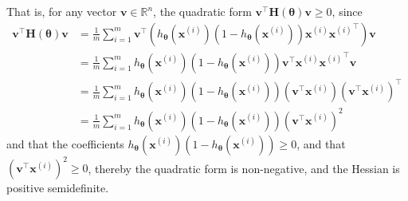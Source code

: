 That is, for any vector \( \mathbf{v} \in \mathbb{R}^n \), the quadratic form \( \mathbf{v}^\top \mathbf{H}(\boldsymbol{\theta}) \mathbf{v} \geq 0 \), since
\begin{align*}
    \mathbf{v}^\top \mathbf{H}(\boldsymbol{\theta}) \mathbf{v}
     & =
    \frac{1}{m} \sum_{i=1}^{m}
    \mathbf{v}^\top
    \left(
    h_{\boldsymbol{\theta}}\left(\mathbf{x}^{(i)}\right) \left(1-h_{\boldsymbol{\theta}}\left(\mathbf{x}^{(i)}\right)\right)
    \mathbf{x}^{(i)} {\mathbf{x}^{(i)}}^\top
    \right)
    \mathbf{v}
    \\ & =
    \frac{1}{m} \sum_{i=1}^{m}
    h_{\boldsymbol{\theta}}\left(\mathbf{x}^{(i)}\right) \left(1-h_{\boldsymbol{\theta}}\left(\mathbf{x}^{(i)}\right)\right)
    \mathbf{v}^\top
    \mathbf{x}^{(i)} {\mathbf{x}^{(i)}}^\top
    \mathbf{v}
    \\ & =
    \frac{1}{m} \sum_{i=1}^{m}
    h_{\boldsymbol{\theta}}\left(\mathbf{x}^{(i)}\right) \left(1-h_{\boldsymbol{\theta}}\left(\mathbf{x}^{(i)}\right)\right)
    \left(\mathbf{v}^\top \mathbf{x}^{(i)}\right) {\left(\mathbf{v}^\top \mathbf{x}^{(i)}\right)}^\top
    \\ & =
    \frac{1}{m} \sum_{i=1}^{m}
    h_{\boldsymbol{\theta}}\left(\mathbf{x}^{(i)}\right) \left(1-h_{\boldsymbol{\theta}}\left(\mathbf{x}^{(i)}\right)\right)
    {\left(\mathbf{v}^\top \mathbf{x}^{(i)}\right)}^2
\end{align*}
and that the coefficients \( h_{\boldsymbol{\theta}}\left(\mathbf{x}^{(i)}\right) \left(1-h_{\boldsymbol{\theta}}\left(\mathbf{x}^{(i)}\right)\right) \geq 0 \), and that \( {\left(\mathbf{v}^\top \mathbf{x}^{(i)}\right)}^2 \geq 0 \), thereby the quadratic form is non-negative, and the Hessian is positive semidefinite.
